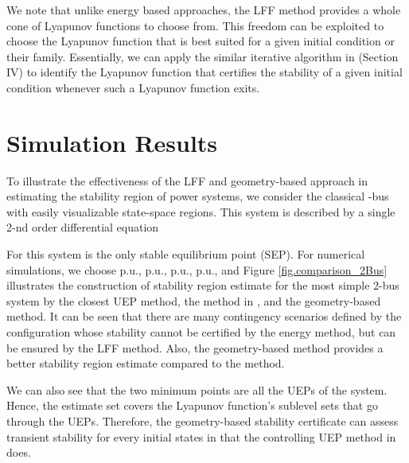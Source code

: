\documentclass[final]{IEEEtran}
\begin{document}
We note that unlike energy based approaches, the LFF method provides a whole
cone of Lyapunov functions to choose from. This freedom can be
exploited to choose the Lyapunov function that is best suited for
a given initial condition or their family. Essentially, we can apply the similar
 iterative algorithm in \cite{Vu:2014} (Section IV) to identify the Lyapunov
function that certifies the stability of a given initial condition
 whenever such a Lyapunov function exits.

\section{Simulation Results}
\label{sec:simulation}

To illustrate the effectiveness of the LFF and geometry-based approach in estimating the stability region of power systems, we consider the classical -bus with easily visualizable
state-space regions. This system is described by a single 2-nd
order differential equation

For this system  is the only stable
equilibrium point (SEP). For numerical simulations, we choose
 p.u.,  p.u.,  p.u.,  p.u., and
 Figure \ref{fig.comparison_2Bus} illustrates the construction of stability region estimate for the most simple 2-bus system by the closest UEP method, the  method in \cite{Vu:2014},
and the geometry-based method. It can be seen that there are many
contingency scenarios defined by the configuration  whose
stability cannot be certified by the energy method, but
can be ensured by the LFF method. Also, the geometry-based method provides a better stability region estimate 
compared to the  method.

We can also see that the two minimum points  are all the UEPs of the system. Hence, the estimate set  covers the Lyapunov function's sublevel sets that go through the UEPs. Therefore, the geometry-based stability certificate can assess transient stability for every initial states in  that the controlling UEP method in \cite{Zou:2003ji} does.
\end{document}
